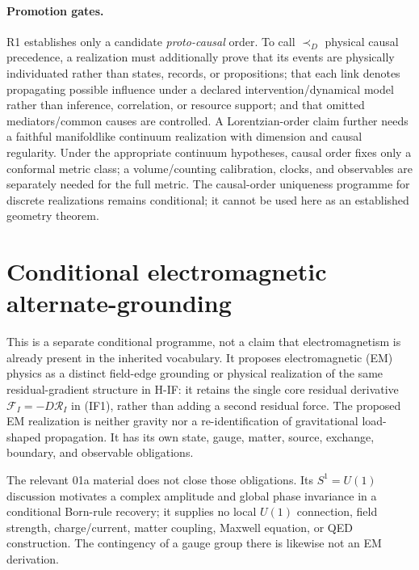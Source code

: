 \documentclass[11pt,a4paper]{article}
\theoremstyle{remark}
\begin{document}
\paragraph{Promotion gates.}
R1 establishes only a candidate \emph{proto-causal} order. To call
$\prec_D$ physical causal precedence, a realization must additionally prove
that its events are physically individuated rather than states, records, or
propositions; that each link denotes propagating possible influence under a
declared intervention/dynamical model rather than inference, correlation, or
resource support; and that omitted mediators/common causes are controlled. A
Lorentzian-order claim further needs a faithful manifoldlike continuum
realization with dimension and causal regularity. Under the appropriate
continuum hypotheses, causal order fixes only a conformal metric class; a
volume/counting calibration, clocks, and observables are separately needed for
the full metric. The causal-order uniqueness programme for discrete realizations
remains conditional; it cannot be used here as an established geometry theorem.

\section{Conditional electromagnetic alternate-grounding}\label{sec:em}
This is a separate conditional programme, not a claim that electromagnetism is
already present in the inherited vocabulary. It proposes electromagnetic (EM)
physics as a distinct field-edge grounding or physical realization of the same
residual-gradient structure in H-IF: it retains the single core residual
derivative $\mathcal F_I=-D\mathcal R_I$ in (IF1), rather than adding a second
residual force. The proposed EM realization is neither gravity nor a
re-identification of gravitational load-shaped propagation. It has its own
state, gauge, matter, source, exchange, boundary, and observable obligations.

The relevant 01a material does not close those obligations. Its $S^1=U(1)$
discussion motivates a complex amplitude and global phase invariance in a
conditional Born-rule recovery; it supplies no local $U(1)$ connection, field
strength, charge/current, matter coupling, Maxwell equation, or QED
construction. The contingency of a gauge group there is likewise not an EM
derivation.
\end{document}
